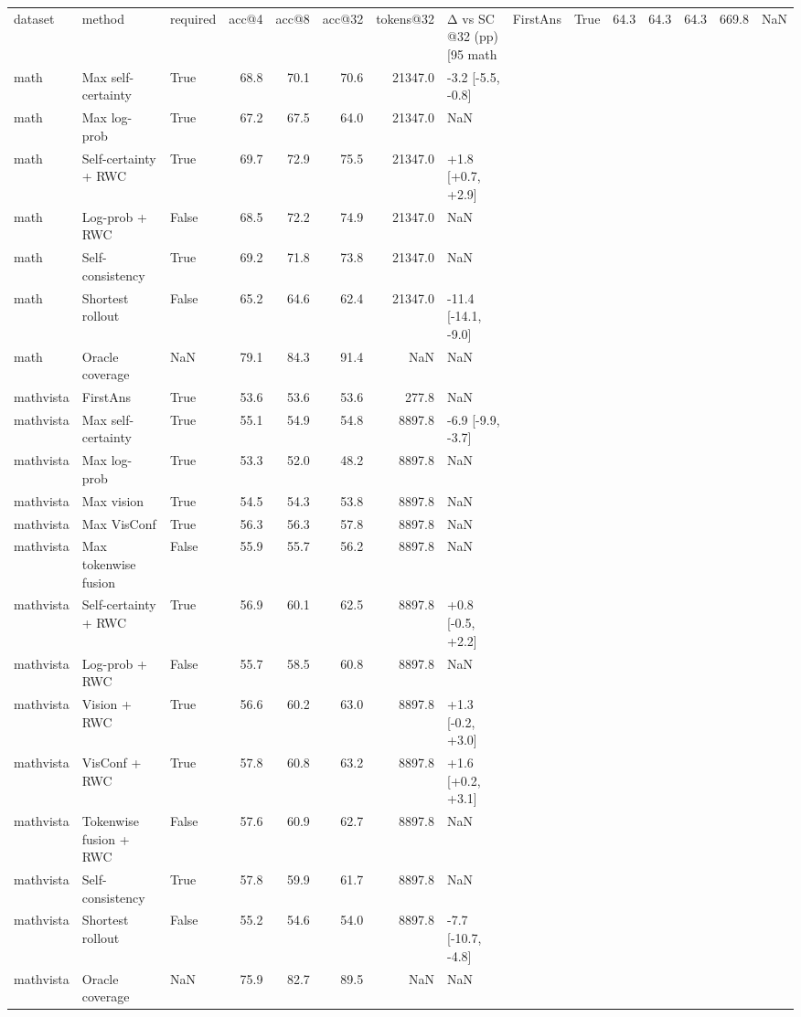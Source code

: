 \begin{tabular}{lllrrrrl}
\toprule
dataset & method & required & acc@4 & acc@8 & acc@32 & tokens@32 & Δ vs SC @32 (pp) [95%
\midrule
math & FirstAns & True & 64.3 & 64.3 & 64.3 & 669.8 & NaN \\
math & Max self-certainty & True & 68.8 & 70.1 & 70.6 & 21347.0 & -3.2 [-5.5, -0.8] \\
math & Max log-prob & True & 67.2 & 67.5 & 64.0 & 21347.0 & NaN \\
math & Self-certainty + RWC & True & 69.7 & 72.9 & 75.5 & 21347.0 & +1.8 [+0.7, +2.9] \\
math & Log-prob + RWC & False & 68.5 & 72.2 & 74.9 & 21347.0 & NaN \\
math & Self-consistency & True & 69.2 & 71.8 & 73.8 & 21347.0 & NaN \\
math & Shortest rollout & False & 65.2 & 64.6 & 62.4 & 21347.0 & -11.4 [-14.1, -9.0] \\
math & Oracle coverage & NaN & 79.1 & 84.3 & 91.4 & NaN & NaN \\
mathvista & FirstAns & True & 53.6 & 53.6 & 53.6 & 277.8 & NaN \\
mathvista & Max self-certainty & True & 55.1 & 54.9 & 54.8 & 8897.8 & -6.9 [-9.9, -3.7] \\
mathvista & Max log-prob & True & 53.3 & 52.0 & 48.2 & 8897.8 & NaN \\
mathvista & Max vision & True & 54.5 & 54.3 & 53.8 & 8897.8 & NaN \\
mathvista & Max VisConf & True & 56.3 & 56.3 & 57.8 & 8897.8 & NaN \\
mathvista & Max tokenwise fusion & False & 55.9 & 55.7 & 56.2 & 8897.8 & NaN \\
mathvista & Self-certainty + RWC & True & 56.9 & 60.1 & 62.5 & 8897.8 & +0.8 [-0.5, +2.2] \\
mathvista & Log-prob + RWC & False & 55.7 & 58.5 & 60.8 & 8897.8 & NaN \\
mathvista & Vision + RWC & True & 56.6 & 60.2 & 63.0 & 8897.8 & +1.3 [-0.2, +3.0] \\
mathvista & VisConf + RWC & True & 57.8 & 60.8 & 63.2 & 8897.8 & +1.6 [+0.2, +3.1] \\
mathvista & Tokenwise fusion + RWC & False & 57.6 & 60.9 & 62.7 & 8897.8 & NaN \\
mathvista & Self-consistency & True & 57.8 & 59.9 & 61.7 & 8897.8 & NaN \\
mathvista & Shortest rollout & False & 55.2 & 54.6 & 54.0 & 8897.8 & -7.7 [-10.7, -4.8] \\
mathvista & Oracle coverage & NaN & 75.9 & 82.7 & 89.5 & NaN & NaN \\
\bottomrule
\end{tabular}
